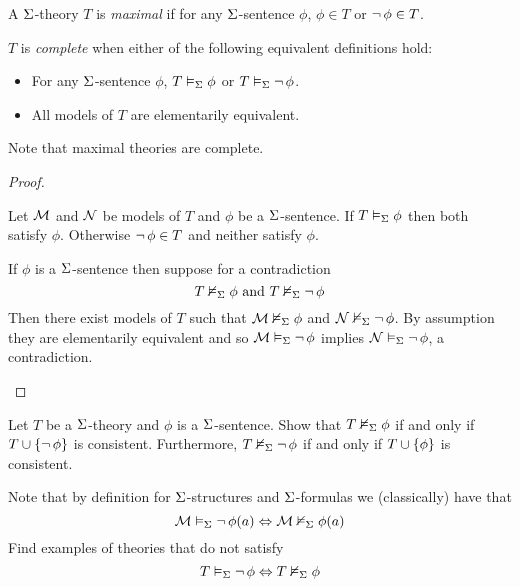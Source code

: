 \begin{dfn}
    A $\Sigma$-theory $T$ is \textit{maximal} if
    for any $\Sigma$-sentence $\phi$,
    $\phi \in T$ or $\neg\, \phi \in T$.

    $T$ is \textit{complete}
    when either of the following equivalent
    definitions hold:
    \begin{itemize}
        \item For any $\Sigma$-sentence $\phi$,
            $T \vDash_{\Sigma} \phi$ or
            $T \vDash_{\Sigma} \neg\, \phi$.
        \item All models of $T$ are elementarily equivalent.
    \end{itemize}
    Note that maximal theories are complete.
\end{dfn}
\begin{proof}
    \begin{forward}
        Let $\mathcal{M}$ and $\mathcal{N}$ be models of $T$
        and $\phi$ be a $\Sigma$-sentence.
        If $T \vDash_{\Sigma} \phi$ then both satisfy $\phi$.
        Otherwise $\neg\, \phi \in T$ and neither satisfy $\phi$.
    \end{forward}

    \begin{backward}
        If $\phi$ is a $\Sigma$-sentence then suppose for a contradiction
        \[T \nvDash_{\Sigma} \phi \text{ and } T \nvDash_{\Sigma} \neg\, \phi\]
        Then there exist models of $T$
        such that $\mathcal{M} \nvDash_{\Sigma} \phi$ and $\mathcal{N} \nvDash_{\Sigma} \neg\, \phi$.
        By assumption they are elementarily equivalent and so
        $\mathcal{M} \vDash_{\Sigma} \neg\, \phi$ implies $\mathcal{N} \vDash_{\Sigma} \neg\, \phi$,
        a contradiction.
    \end{backward}
\end{proof}

\begin{ex}
    Let $T$ be a $\Sigma$-theory
    and $\phi$ is a $\Sigma$-sentence.
    Show that $T \nvDash_{\Sigma} \phi$
    if and only if $T \cup \left\{ \neg\, \phi\right\}$ is consistent.
    Furthermore, $T \nvDash_{\Sigma} \neg\, \phi$
    if and only if $T \cup \left\{\phi\right\}$ is consistent.

    Note that by definition for $\Sigma$-structures and
    $\Sigma$-formulas we (classically) have that
    \[
        \mathcal{M} \vDash_{\Sigma} \neg\, \phi(a) \Leftrightarrow \mathcal{M} \nvDash_{\Sigma} \phi(a)
    \]
    Find examples of theories that do not satisfy
    \[
        T \vDash_{\Sigma} \neg\, \phi \Leftrightarrow T \nvDash_{\Sigma} \phi
    \]
\end{ex}
